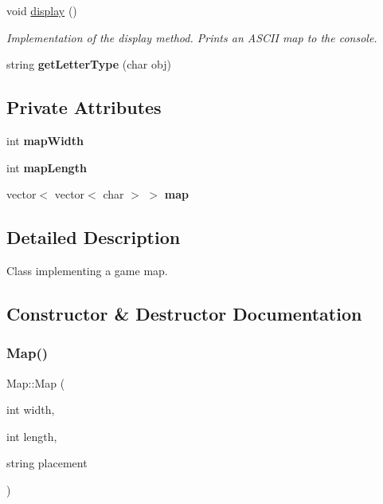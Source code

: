 \begin{DoxyCompactItemize}
\hypertarget{class_map_ad5fa4af56ebdcfdbfe999ae4ba971135}{}\label{class_map_ad5fa4af56ebdcfdbfe999ae4ba971135} 
void \hyperlink{class_map_ad5fa4af56ebdcfdbfe999ae4ba971135}{display} ()
\begin{DoxyCompactList}\small\item\em Implementation of the display method. Prints an A\+S\+C\+II map to the console. \end{DoxyCompactList}\item 
\hypertarget{class_map_a28c36f49c57428b6ac725c38a12d9b53}{}\label{class_map_a28c36f49c57428b6ac725c38a12d9b53} 
string {\bfseries get\+Letter\+Type} (char obj)
\end{DoxyCompactItemize}
\subsection*{Private Attributes}
\begin{DoxyCompactItemize}
\item 
\hypertarget{class_map_a9660b072c56d69d3639e364835f0188d}{}\label{class_map_a9660b072c56d69d3639e364835f0188d} 
int {\bfseries map\+Width}
\item 
\hypertarget{class_map_a905815e667dbc9927b87a10b95678a56}{}\label{class_map_a905815e667dbc9927b87a10b95678a56} 
int {\bfseries map\+Length}
\item 
\hypertarget{class_map_aeb5d12683a411934e245edce406021ff}{}\label{class_map_aeb5d12683a411934e245edce406021ff} 
vector$<$ vector$<$ char $>$ $>$ {\bfseries map}
\end{DoxyCompactItemize}


\subsection{Detailed Description}
Class implementing a game map. 

\subsection{Constructor \& Destructor Documentation}
\hypertarget{class_map_a6c356d09b5b7c946b5a3cf23dbabe0b2}{}\label{class_map_a6c356d09b5b7c946b5a3cf23dbabe0b2} 
\subsubsection{\texorpdfstring{Map()}{Map()}}
{\footnotesize\ttfamily Map\+::\+Map (\begin{DoxyParamCaption}\item[{int}]{width,  }\item[{int}]{length,  }\item[{string}]{placement }\end{DoxyParamCaption})}

